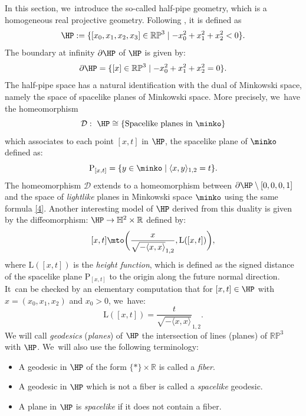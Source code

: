 In this section, we~introduce the so-called half-pipe geometry, which is a homogeneous real projective geometry. Following
\cite{danciger_thesis}, it is defined as
\[
\HP :=\{[x_0,x_1,x_2,x_3]\in\mathbb{RP}^3\mid -x_0^2+x_1^2+x_2^2<0\}.
\]
The boundary at infinity $\partial\HP$ of $\HP$ is given by:
\[
\partial\HP=\{[x]\in \mathbb{RP}^3\mid -x_0^2+x_1^2+x_2^2=0\}.
\]The half-pipe space has a natural identification with the dual of Minkowski space, namely the space of spacelike planes of Minkowski space. More precisely, we~have the homeomorphism
\begin{equation}\label{hpminko}
\mathcal{D}:\ \HP\cong \{\text{Spacelike planes in } \minko\}
\end{equation}
which associates to each point $[x,t]$ in $\HP$, the spacelike plane of $\minko$ defined as:
\begin{equation}\label{4}
\mathrm{P}_{[x,t]}=\{ y \in \minko \mid \langle x,y \rangle_{1,2} = t \}.
\end{equation}
The homeomorphism $\mathcal{D}$ extends to a homeomorphism between $\partial\HP\setminus[0,0,0,1]$ and the space of \emph{lightlike} planes in Minkowski space $\minko$ using the same formula \eqref{4}. Another interesting model of $\HP$ derived from this duality is given by the diffeomorphism: $\HP\to\mathbb{H}^2\times\mathbb{R}$ defined by:
\begin{equation}\label{L}
[x,t]\mto\biggl(\frac{x}{\sqrt{-\langle x,x\rangle}_{1,2}},\mathrm{L}([x,t])\biggr),
\end{equation}
where $\mathrm{L}([x,t])$ is the \emph{height function}, which is defined as the signed distance of the spacelike plane $\mathrm{P}_{[x,t]}$ to the origin along the future normal direction. It~can be checked by an elementary computation that for \([x,t] \in \HP\) with \(x = (x_0, x_1, x_2)\) and \(x_0 > 0\), we~have: \begin{equation}\label{formule_L}
\mathrm{L}([x,t])=\frac{t}{\sqrt{-\langle x,x\rangle}}_{1,2}.
\end{equation}
We will call \emph{geodesics} (\resp \emph{planes}) of $\HP$ the intersection of lines (\resp planes) of $\mathbb{RP}^3$ with $\HP$. We~will also use the following terminology:
\begin{itemize}
\item A geodesic in $\HP$ of the form $\{*\}\times \mathbb{R}$ is called a \emph{fiber}.
\item A geodesic in $\HP$ which is not a fiber is called a \emph{spacelike} geodesic.
\item A plane in $\HP$ is \emph{spacelike} if it does not contain a fiber.
\end{itemize}
